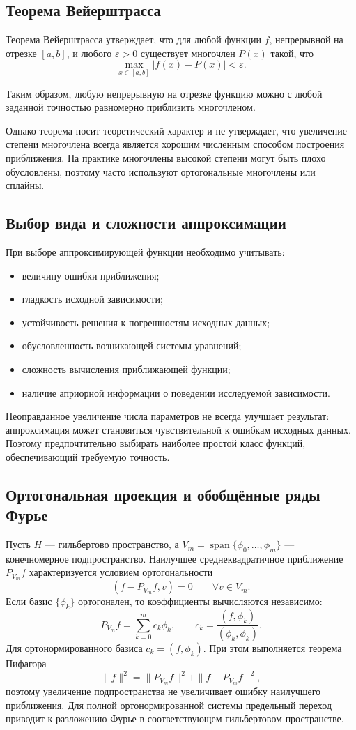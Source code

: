 \subsection{Теорема Вейерштрасса}

Теорема Вейерштрасса утверждает, что для любой функции $f$, непрерывной на отрезке $[a,b]$, и любого $\varepsilon>0$ существует многочлен $P(x)$ такой, что
\[
\max_{x\in[a,b]}|f(x)-P(x)|<\varepsilon.
\]

Таким образом, любую непрерывную на отрезке функцию можно с любой заданной точностью равномерно приблизить многочленом.

Однако теорема носит теоретический характер и не утверждает, что увеличение степени многочлена всегда является хорошим численным способом построения приближения. На практике многочлены высокой степени могут быть плохо обусловлены, поэтому часто используют ортогональные многочлены или сплайны.

\subsection{Выбор вида и сложности аппроксимации}

При выборе аппроксимирующей функции необходимо учитывать:
\begin{itemize}
	\item величину ошибки приближения;
	\item гладкость исходной зависимости;
	\item устойчивость решения к погрешностям исходных данных;
	\item обусловленность возникающей системы уравнений;
	\item сложность вычисления приближающей функции;
	\item наличие априорной информации о поведении исследуемой зависимости.
\end{itemize}

Неоправданное увеличение числа параметров не всегда улучшает результат: аппроксимация может становиться чувствительной к ошибкам исходных данных. Поэтому предпочтительно выбирать наиболее простой класс функций, обеспечивающий требуемую точность.

\subsection{Ортогональная проекция и обобщённые ряды Фурье}

Пусть $H$ --- гильбертово пространство, а $V_m=\operatorname{span}\{\phi_0,\ldots,\phi_m\}$ ---
конечномерное подпространство. Наилучшее среднеквадратичное приближение $P_{V_m}f$
характеризуется условием ортогональности
\[
    (f-P_{V_m}f,v)=0\qquad \forall v\in V_m.
\]
Если базис $\{\phi_k\}$ ортогонален, то коэффициенты вычисляются независимо:
\[
    P_{V_m}f=\sum_{k=0}^{m}c_k\phi_k,
    \qquad
    c_k=\frac{(f,\phi_k)}{(\phi_k,\phi_k)}.
\]
Для ортонормированного базиса $c_k=(f,\phi_k)$. При этом выполняется теорема Пифагора
\[
    \|f\|^2=\|P_{V_m}f\|^2+\|f-P_{V_m}f\|^2,
\]
поэтому увеличение подпространства не увеличивает ошибку наилучшего приближения.
Для полной ортонормированной системы предельный переход приводит к разложению Фурье
в соответствующем гильбертовом пространстве.

